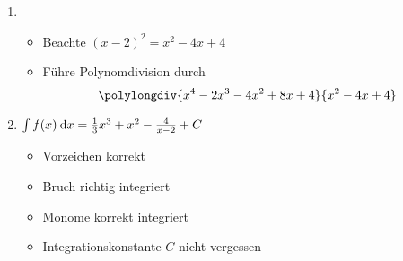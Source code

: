 \item
	\begin{enumerate}
	
	\item
		\begin{itemize}
			\item Beachte $(x-2)^2 = x^2-4x+4$
			\item Führe Polynomdivision durch \[\polylongdiv{x^4-2x^3-4x^2+8x+4}{x^2-4x+4}\]
		\end{itemize}
	
	\item $\int f(x) \:\mathrm{d}{x} = \frac{1}{3} x^3 + x^2 - \frac{4}{x-2} + C$
		\begin{itemize}
			\item Vorzeichen korrekt
			\item Bruch richtig integriert
			\item Monome korrekt integriert
			\item Integrationskonstante $C$ nicht vergessen
		\end{itemize}
		
	\end{enumerate}
